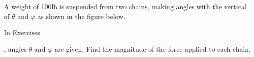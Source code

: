{\noindent A weight of 100lb is suspended from two chains, making angles with the vertical of $\theta$ and $\varphi$ as shown in the figure below.
\begin{center}
\end{center}
In Exercises}
{,  angles $\theta$ and $\varphi$ are given. Find the magnitude of the force applied to each chain.
}
